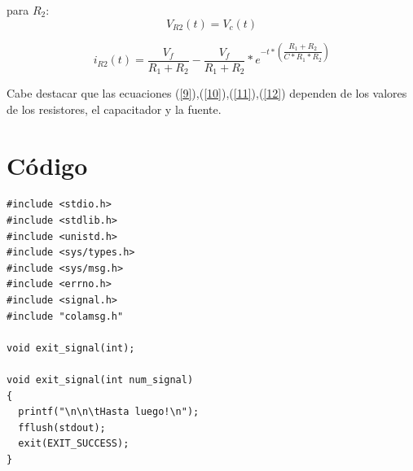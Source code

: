\documentclass[spanish]{article}
\begin{document}
para $R_{2}$:
\begin{equation}\label{11}
V_{R2}(t) = V_{c}(t)
\end{equation}

\begin{equation}\label{12}
i_{R2}(t) = \dfrac{V_{f}}{R_{1} + R_{2}} - \dfrac{V_{f}}{R_{1} + R_{2}} * e^{-t*\left(  \dfrac{R_{1} + R_{2}}{C*R_{1}*R_{2}} \right)}
\end{equation}



Cabe destacar que las ecuaciones (\ref{9}),(\ref{10}),(\ref{11}),(\ref{12}) dependen de los valores de los resistores, el capacitador y la fuente. 

\section{Código}

\begin{lstlisting}
#include <stdio.h>
#include <stdlib.h>
#include <unistd.h>
#include <sys/types.h>
#include <sys/msg.h>
#include <errno.h>
#include <signal.h>
#include "colamsg.h"

void exit_signal(int);

void exit_signal(int num_signal)
{
  printf("\n\n\tHasta luego!\n");
  fflush(stdout);  
  exit(EXIT_SUCCESS);  
}

\end{lstlisting}
\end{document}
